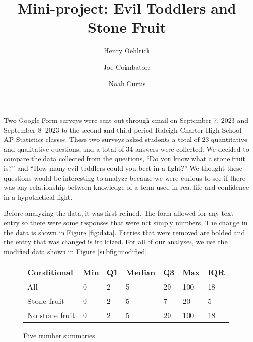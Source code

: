 \documentclass{article}
\title{Mini-project: Evil Toddlers and Stone Fruit}
\author{Henry Oehlrich \and Joe Coimbatore \and Noah Curtis}
\begin{document}
\maketitle

Two Google Form surveys were sent out through email on September 7, 2023 and
September 8, 2023 to the second and third period Raleigh Charter High School AP
Statistics classes. These two surveys asked students a total of 23 quantitative
and qualitative questions, and a total of 34 answers were collected. We decided
to compare the data collected from the questions, “Do you know what a stone
fruit is?” and “How many evil toddlers could you beat in a fight?” We thought
these questions would be interesting to analyze because we were curious to see
if there was any relationship between knowledge of a term used in real life and
confidence in a hypothetical fight.

Before analyzing the data, it was first refined. The form allowed for any text
entry so there were some responses that were not simply numbers. The change in
the data is shown in Figure \ref{fig:data}. Entries that were removed are
bolded and the entry that was changed is italicized. For all of our analyses,
we use the modified data shown in Figure \ref{subfig:modified}.

\begin{figure}[ht]
    \centering
    \caption{Five number summaries}
    \label{fig:fivenum}
    \begin{tabular}{l|l|l|l|l|l|l}
        \toprule
        Conditional & Min & Q1 & Median & Q3 & Max & IQR \\
        \midrule
        All & 0 & 2 & 5 & 20 & 100 & 18 \\
        Stone fruit & 0 & 2 & 5 & 7 & 20 & 5 \\
        No stone fruit & 0 & 2 & 5 & 20 & 100 & 18 \\
    \end{tabular}
\end{figure}
\end{document}
